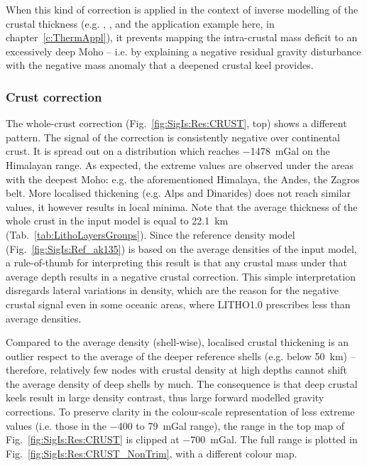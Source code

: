 When this kind of correction is applied in the context of inverse modelling of the crustal thickness (e.g. \cite{Tenzer2014regional}, \cite{Eshagh2017}, and the application example here, in chapter~\ref{c:ThermAppl}), it prevents mapping the intra-crustal mass deficit to an excessively deep Moho -- i.e. by explaining a negative residual gravity disturbance with the negative mass anomaly that a deepened crustal keel provides.

\subsubsection{Crust correction}
\label{sss:SigIs:Results:Maps:CRUST}
The whole-crust correction (Fig.~\ref{fig:SigIs:Res:CRUST}, top) shows a different pattern.
The signal of the correction is consistently negative over continental crust.
It is spread out on a distribution which reaches \SI{-1478}{mGal} on the Himalayan range.
As expected, the extreme values are observed under the areas with the deepest Moho: e.g. the aforementioned Himalaya, the Andes, the Zagros belt.
More localised thickening (e.g. Alps and Dinarides) does not reach similar values, it however results in local minima.
Note that the average thickness of the whole crust in the input model is equal to \SI{22.1}{\kilo \metre} (Tab.~\ref{tab:LithoLayersGroups}).
Since the reference density model (Fig.~\ref{fig:SigIs:Ref_ak135}) is based on the average densities of the input model, a rule-of-thumb for interpreting this result is that any crustal mass under that average depth results in a negative crustal correction.
This simple interpretation disregards lateral variations in density, which are the reason for the negative crustal signal even in some oceanic areas, where LITHO1.0 prescribes less than average densities.

Compared to the average density (shell-wise), localised crustal thickening is an outlier respect to the average of the deeper reference shells (e.g. below \SI{50}{\kilo \metre}) -- therefore, relatively few nodes with crustal density at high depths cannot shift the average density of deep shells by much.
The consequence is that deep crustal keels result in large density contrast, thus large forward modelled gravity corrections.
To preserve clarity in the colour-scale representation of less extreme values (i.e. those in the \num{-400} to \SI[retain-explicit-plus]{+79}{mGal} range), the range in the top map of Fig.~\ref{fig:SigIs:Res:CRUST} is clipped at \SI{-700}{mGal}.
The full range is plotted in Fig.~\ref{fig:SigIs:Res:CRUST_NonTrim}, with a different colour map.


